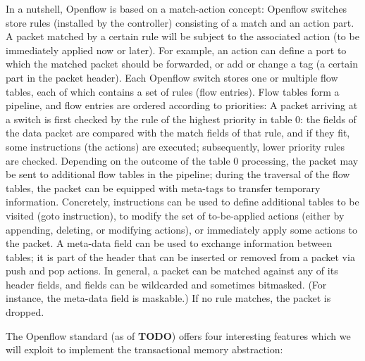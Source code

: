 \documentclass[conference]{sigcomm-alternate}
\begin{document}
In a nutshell,
Openflow
is based on a match-action concept: Openflow switches store
rules (installed by the controller) consisting of a match and an
action part. A packet matched by a certain rule will be subject
to the associated action (to be immediately applied now or later).
For example, an action can define a port to which the
matched packet should be forwarded, or add or change a tag
(a certain part in the packet header).
Each Openflow switch stores one or multiple flow tables,
each of which contains a set of rules (flow entries). Flow
tables form a pipeline, and flow entries are ordered according
to priorities: A packet arriving at a switch is first checked by
the rule of the highest priority in table 0: the fields of the
data packet are compared with the match fields of that rule,
and if they fit, some instructions (the actions) are executed;
subsequently, lower priority rules are checked. Depending on
the outcome of the table 0 processing, the packet may be sent
to additional flow tables in the pipeline; during the traversal of
the flow tables, the packet can be equipped with meta-tags to
transfer temporary information. Concretely, instructions can be
used to define additional tables to be visited (goto instruction),
to modify the set of to-be-applied actions (either by appending,
deleting, or modifying actions), or immediately apply some
actions to the packet. A meta-data field can be used to exchange
information between tables; it is part of the header that can be
inserted or removed from a packet via push and pop actions.
In general, a packet can be matched against any of its header
fields, and fields can be wildcarded and sometimes bitmasked.
(For instance, the meta-data field is maskable.) If no rule
matches, the packet is dropped.

The Openflow standard (as of \textbf{TODO}) offers four interesting
features which we will exploit to implement the transactional memory abstraction:
\end{document}
